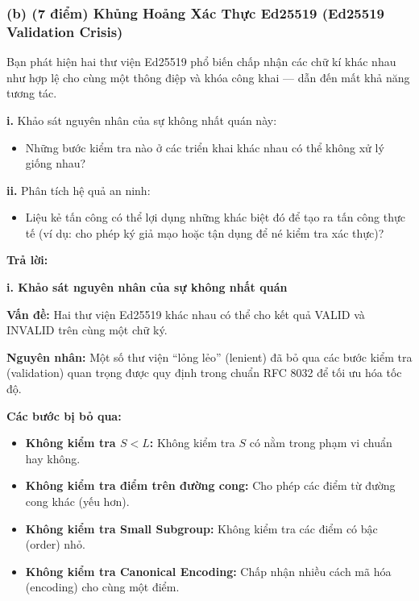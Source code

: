 \subsubsection{(b) (7 điểm) Khủng Hoảng Xác Thực Ed25519 (Ed25519 Validation Crisis)}

Bạn phát hiện hai thư viện Ed25519 phổ biến chấp nhận các chữ kí khác nhau như hợp lệ cho cùng một thông điệp và khóa công khai — dẫn đến mất khả năng tương tác.

\textbf{i.} Khảo sát nguyên nhân của sự không nhất quán này:
\begin{itemize}
    \item Những bước kiểm tra nào ở các triển khai khác nhau có thể không xử lý giống nhau?
\end{itemize}

\textbf{ii.} Phân tích hệ quả an ninh:
\begin{itemize}
    \item Liệu kẻ tấn công có thể lợi dụng những khác biệt đó để tạo ra tấn công thực tế (ví dụ: cho phép ký giả mạo hoặc tận dụng để né kiểm tra xác thực)?
\end{itemize}

\begin{center}
    \textbf{Trả lời:}
\end{center}

\textbf{i. Khảo sát nguyên nhân của sự không nhất quán}

\textbf{Vấn đề:} Hai thư viện Ed25519 khác nhau có thể cho kết quả VALID và INVALID trên cùng một chữ ký.

\textbf{Nguyên nhân:} Một số thư viện ``lỏng lẻo'' (lenient) đã bỏ qua các bước kiểm tra (validation) quan trọng được quy định trong chuẩn RFC 8032 để tối ưu hóa tốc độ.

\textbf{Các bước bị bỏ qua:}
\begin{itemize}
    \item \textbf{Không kiểm tra $S < L$:} Không kiểm tra $S$ có nằm trong phạm vi chuẩn hay không.
    
    \item \textbf{Không kiểm tra điểm trên đường cong:} Cho phép các điểm từ đường cong khác (yếu hơn).
    
    \item \textbf{Không kiểm tra Small Subgroup:} Không kiểm tra các điểm có bậc (order) nhỏ.
    
    \item \textbf{Không kiểm tra Canonical Encoding:} Chấp nhận nhiều cách mã hóa (encoding) cho cùng một điểm.
\end{itemize}


